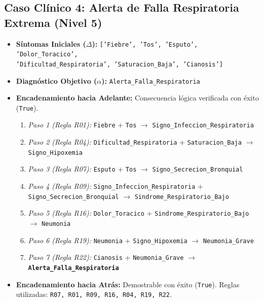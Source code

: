 \documentclass[11pt,a4paper]{article}
\begin{document}
\subsection{Caso Clínico 4: Alerta de Falla Respiratoria Extrema (Nivel 5)}
\begin{itemize}
    \item \textbf{Síntomas Iniciales ($\Delta$):} \texttt{['Fiebre', 'Tos', 'Esputo', 'Dolor\_Toracico', \\'Dificultad\_Respiratoria', 'Saturacion\_Baja', 'Cianosis']}
    \item \textbf{Diagnóstico Objetivo ($\alpha$):} \texttt{Alerta\_Falla\_Respiratoria}
    \item \textbf{Encadenamiento hacia Adelante:} Consecuencia lógica verificada con éxito (\texttt{True}).
    \begin{enumerate}
        \item \textit{Paso 1 (Regla R01):} \texttt{Fiebre} + \texttt{Tos} $\rightarrow$ \texttt{Signo\_Infeccion\_Respiratoria}
        \item \textit{Paso 2 (Regla R04):} \texttt{Dificultad\_Respiratoria} + \texttt{Saturacion\_Baja} $\rightarrow$ \texttt{Signo\_Hipoxemia}
        \item \textit{Paso 3 (Regla R07):} \texttt{Esputo} + \texttt{Tos} $\rightarrow$ \texttt{Signo\_Secrecion\_Bronquial}
        \item \textit{Paso 4 (Regla R09):} \texttt{Signo\_Infeccion\_Respiratoria} + \texttt{Signo\_Secrecion\_Bronquial} $\rightarrow$ \texttt{Sindrome\_Respiratorio\_Bajo}
        \item \textit{Paso 5 (Regla R16):} \texttt{Dolor\_Toracico} + \texttt{Sindrome\_Respiratorio\_Bajo} $\rightarrow$ \texttt{Neumonia}
        \item \textit{Paso 6 (Regla R19):} \texttt{Neumonia} + \texttt{Signo\_Hipoxemia} $\rightarrow$ \texttt{Neumonia\_Grave}
        \item \textit{Paso 7 (Regla R22):} \texttt{Cianosis} + \texttt{Neumonia\_Grave} $\rightarrow$ \textbf{\texttt{Alerta\_Falla\_Respiratoria}}
    \end{enumerate}
    \item \textbf{Encadenamiento hacia Atrás:} Demostrable con éxito (\texttt{True}). Reglas utilizadas: \texttt{R07, R01, R09, R16, R04, R19, R22}.
\end{itemize}
\end{document}
